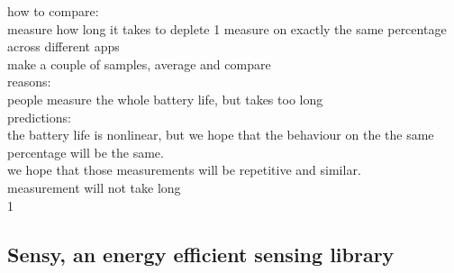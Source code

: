 how to compare:\\
	measure how long it takes to deplete 1%
		measure on exactly the same percentage across different apps\\
		make a couple of samples, average and compare\\
		reasons:\\
			people measure the whole battery life, but takes too long\\
		predictions:\\
			the battery life is nonlinear, but we hope that the behaviour on the the same percentage will be the same.\\
			we hope that those measurements will be repetitive and similar.\\
			measurement will not take long\\
			1%
			
			
		
		
		
\subsection{Sensy, an energy efficient sensing library}
